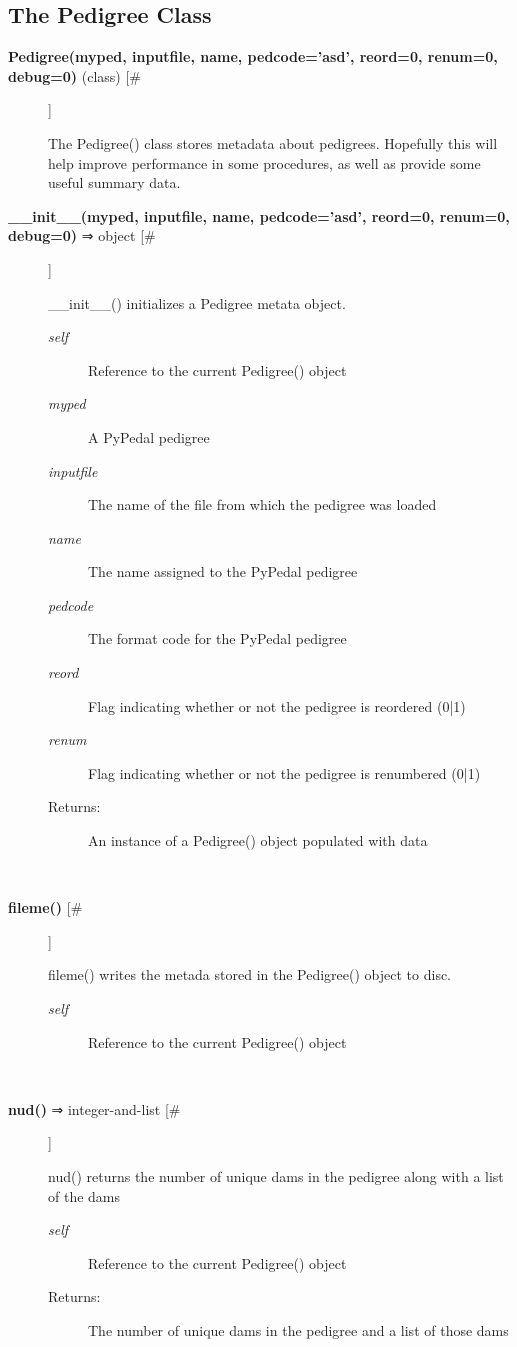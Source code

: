 \subsection*{The Pedigree Class}
\begin{description}
\item[\textbf{Pedigree(myped, inputfile, name, pedcode='asd', reord=0, renum=0, debug=0)} (class) [\#]
]
\par The Pedigree() class stores metadata about pedigrees.  Hopefully this will help improve performance in some procedures,
as well as provide some useful summary data.

\item[\textbf{\_\_init\_\_(myped, inputfile, name, pedcode='asd', reord=0, renum=0, debug=0)} ⇒ object [\#]
]
\par \_\_init\_\_() initializes a Pedigree metata object.
\begin{description}
\item[\textit{self}
]
Reference to the current Pedigree() object
\item[\textit{myped}
]
A PyPedal pedigree
\item[\textit{inputfile}
]
The name of the file from which the pedigree was loaded
\item[\textit{name}
]
The name assigned to the PyPedal pedigree
\item[\textit{pedcode}
]
The format code for the PyPedal pedigree
\item[\textit{reord}
]
Flag indicating whether or not the pedigree is reordered (0|1)
\item[\textit{renum}
]
Flag indicating whether or not the pedigree is renumbered (0|1)
\item[Returns:
]
An instance of a Pedigree() object populated with data
\end{description}\\

\item[\textbf{fileme()} [\#]
]
\par fileme() writes the metada stored in the Pedigree() object to disc.
\begin{description}
\item[\textit{self}
]
Reference to the current Pedigree() object
\end{description}\\

\item[\textbf{nud()} ⇒ integer-and-list [\#]
]
\par nud() returns the number of unique dams in the pedigree along with a list of the dams
\begin{description}
\item[\textit{self}
]
Reference to the current Pedigree() object
\item[Returns:
]
The number of unique dams in the pedigree and a list of those dams
\end{description}\\


\end{description}
